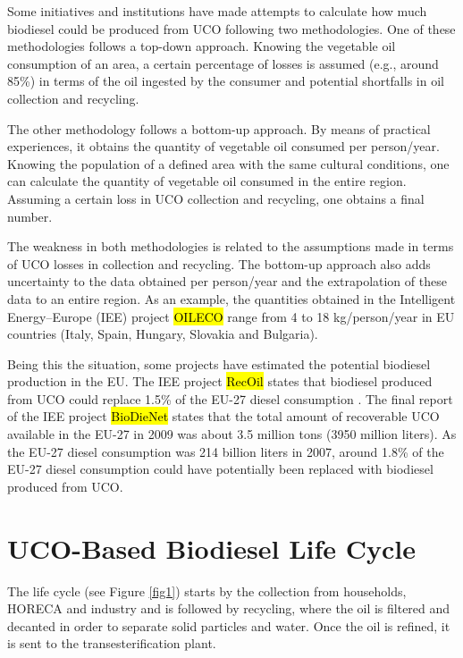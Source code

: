 \documentclass[sustainability,article,accept,moreauthors,pdftex,12pt,a4paper]{mdpi}
\begin{document}
Some initiatives and institutions have made attempts to calculate how much biodiesel could be produced from UCO following two methodologies. One of these methodologies follows a top-down approach. Knowing the vegetable oil consumption of an area, a certain percentage of losses is assumed (e.g., around 85\%) in terms of the oil ingested by the consumer and potential shortfalls in oil collection and recycling.

The other methodology follows a bottom-up approach. By means of practical experiences, it obtains the quantity of vegetable oil consumed per person/year. Knowing the population of a defined area with the same cultural conditions, one can calculate the quantity of vegetable oil consumed in the entire region. Assuming a certain loss in UCO collection and recycling, one obtains a final number.

The weakness in both methodologies is related to the assumptions made in terms of UCO losses in collection and recycling. The bottom-up approach also adds uncertainty to the data obtained per person/year and the extrapolation of these data to an entire region. As an example, the quantities obtained in the Intelligent Energy--Europe (IEE) project \hl{OILECO} %
 range from 4 to 18 kg/person/year \cite{OILECO2013} in EU countries (Italy, Spain, Hungary, Slovakia and Bulgaria).
 
Being this the situation, some projects have estimated the potential biodiesel production in the EU. The IEE project \hl{RecOil} %
 states that biodiesel produced from UCO could replace 1.5\% of the EU-27 diesel consumption \cite{RecOil2013}. The final report of the IEE project \hl{BioDieNet} %
 \cite{BioDieNet2009} states that the total amount of recoverable UCO available in the EU-27 in 2009 was about 3.5 million tons (3950 million liters). As the EU-27 diesel consumption was 214 billion liters in 2007, around 1.8\% of the EU-27 diesel consumption could have potentially been replaced with biodiesel produced from UCO.


\section{UCO-Based Biodiesel Life Cycle}

The life cycle (see Figure \ref{fig1}) starts by the collection from households, HORECA and industry and is followed by recycling, where the oil is filtered and decanted in order to separate solid particles and water. Once the oil is refined, it is sent to the transesterification plant.
\end{document}
